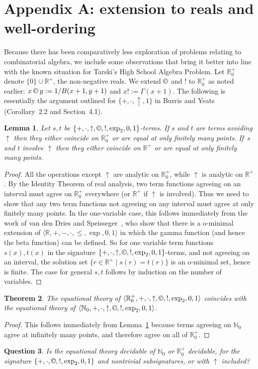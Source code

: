 \documentclass[eqnor,reqno]{amsart}
\theoremstyle{plain}
\newtheorem{thm}{Theorem}[section]
\newtheorem{lem}[thm]{Lemma}
\newtheorem{question}[thm]{Question}
\theoremstyle{definition}
\newcommand{\cc}{\mathbin{\textup{\copyright}}}
\begin{document}
\section*{Appendix A: extension to reals and well-ordering}
Because there has been comparatively less exploration of problems relating to combinatorial algebra, we include some observations that bring it better into line with the known situation for Tarski's High School Algebra Problem.
Let $\mathbb{R}_0^+$ denote $\{0\}\cup\mathbb{R}^+$, the non-negative reals.  
We extend $\cc$ and $!$ to $\mathbb{R}_0^+$ as noted earlier: $x\cc y := 1/B(x+1,y+1)$ and $x!:=\Gamma(x+1)$.  
The following is essentially the argument outlined for $\{+,\cdot,\uparrow,1\}$ in Burris and Yeats~\cite{buryea} (Corollary~2.2 and Section~4.1).
\begin{lem}\label{lem:Hardy}
Let $s,t$ be $\{+,\cdot,\uparrow,\cc,!,\exp_2,0,1\}$-terms.  If $s$ and $t$ are terms avoiding $\uparrow$ then they either coincide on $\mathbb{R}_0^+$ or are equal at only finitely many points.  If~$s$ and $t$ involve $\uparrow$ then they either coincide on $\mathbb{R}^+$ or are equal at only finitely many points.
\end{lem}
\begin{proof}
All the operations except $\uparrow$ are analytic on $\mathbb{R}_0^+$, while $\uparrow$ is analytic on $\mathbb{R}^+$.  By the Identity Theorem of real analysis, two term functions agreeing on an interval must agree on $\mathbb{R}_0^+$ everywhere (or  $\mathbb{R}^+$ if $\uparrow$ is involved).  
Thus we need to show that any two term functions not agreeing on any interval must agree at only finitely many points.  In the one-variable case, this follows immediately from the work of van den Dries and Speisseger~\cite{vddspe}, who show that there is a o-minimal extension of $\langle\mathbb{R},+,-,\cdot,\leq,\exp, 0,1\rangle$ in which the gamma function (and hence the beta function) can be defined.  
So for one variable term functions $s(x),t(x)$ in the signature $\{+,\cdot,\uparrow,\cc,!,\exp_2,0,1\}$-terms, and not agreeing on an interval, the solution set $\{r\in \mathbb{R}^+\mid s(r)=t(r)\}$ is an o-minimal set, hence is finite.  
The case for general $s,t$ follows by induction on the number of variables.
\end{proof}
\begin{thm}
The equational theory of $\langle \mathbb{R}_0^+,+,\cdot,\uparrow,\cc,!,\exp_2,0,1\rangle$ coincides with the equational theory of $\langle \mathbb{N}_0,+,\cdot,\uparrow,\cc,!,\exp_2,0,1\rangle$.
\end{thm}
\begin{proof}
This follows immediately from Lemma~\ref{lem:Hardy} because terms agreeing on $\mathbb{N}_0$ agree at infinitely many points, and therefore agree on all of $\mathbb{R}^+_0$.
\end{proof}
\begin{question}
Is the equational theory decidable of $\mathbb{N}_0$ or $\mathbb{R}_0^+$ decidable, for the signature $\{+,\cdot,\cc,!,\exp_2,0,1\}$ and nontrivial subsignatures, or with $\uparrow$ included?
\end{question}
\end{document}
